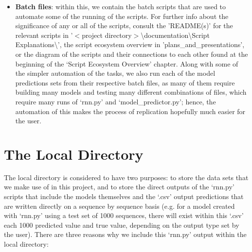 \documentclass[12pt,twoside]{report}
\begin{document}
\begin{itemize}
	\begin{itemize}
		\item \textbf{Batch files}: within this, we contain the batch scripts that are used to automate some of the running of the scripts. For further info about the significance of any or all of the scripts, consult the 'README(s)' for the relevant scripts in '$<$project directory$>$\textbackslash documentation\textbackslash Script Explanations\textbackslash', the script ecosystem overview in 'plans\_and\_presentations', or the diagram of the scripts and their connections to each other found at the beginning of the ‘Script Ecosystem Overview’ chapter. Along with some of the simpler automation of the tasks, we also run each of the model predictions sets from their respective batch files, as many of them require building many models and testing many different combinations of files, which require many runs of ‘rnn.py’ and ‘model\_predictor.py’; hence, the automation of this makes the process of replication hopefully much easier for the user.
	\end{itemize}
\end{itemize}


\section{The Local Directory}

\quad The local directory is considered to have two purposes: to store the data sets that we make use of in this project, and to store the direct outputs of the ‘rnn.py’ scripts that include the models themselves and the ‘.csv’ output predictions that are written directly on a sequence by sequence basis (e.g. for a model created with ‘rnn.py’ using a test set of 1000 sequences, there will exist within this ‘.csv’ each 1000 predicted value and true value, depending on the output type set by the user). There are three reasons why we include this ‘rnn.py’ output within the local directory:
\end{document}
